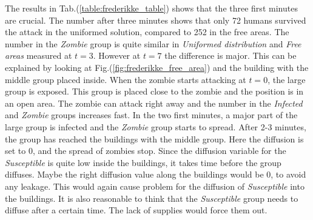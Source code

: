 \documentclass[%
twoside,                 %
final,                   %
chapterprefix=true,      %
open=right               %
10pt]{book}
\begin{document}
The results in Tab.(\ref{table:frederikke_table}) shows that the three first minutes are crucial. The number after three minutes shows that only 72 humans survived the attack in the uniformed solution, compared to 252 in the free areas. The number in the \emph{Zombie} group is quite similar in \emph{Uniformed distribution} and \emph{Free areas} measured at $t=3$. However at $t=7$ the difference is major. This can be explained by looking at Fig.(\ref{fig:frederikke_free_area}) and the building with the middle group placed inside. When the zombie starts attacking at $t=0$, the large group is exposed. This group is placed close to the zombie and the position is in an open area. The zombie can attack right away and the number in the \emph{Infected} and \emph{Zombie} groups increases fast. In the two first minutes, a major part of the large group is infected and the \emph{Zombie} group starts to spread. After 2-3 minutes, the group has reached the buildings with the middle group. Here the diffusion is set to 0, and the spread of zombies stop. Since the diffusion variable for the \emph{Susceptible} is quite low inside the buildings, it takes time before the group diffuses. Maybe the right diffusion value along the buildings would be 0, to avoid any leakage. This would again cause problem for the diffusion of \emph{Susceptible} into the buildings. It is also reasonable to think that the \emph{Susceptible} group needs to diffuse after a certain time. The lack of supplies would force them out.

\label{table:frederikke_table}
\end{document}

